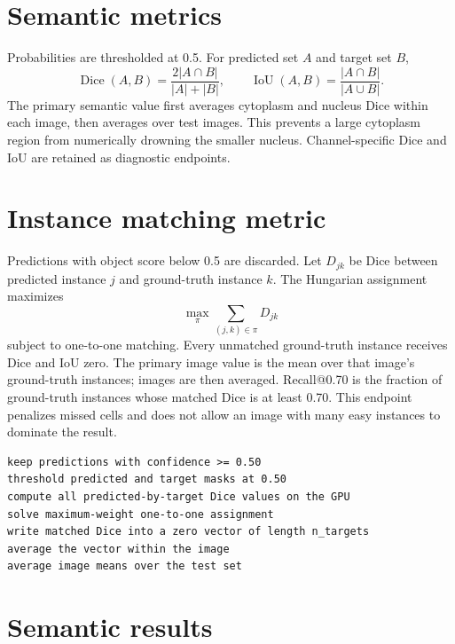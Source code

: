 \section{Semantic metrics}

Probabilities are thresholded at 0.5. For predicted set $A$ and target set $B$,
\begin{equation}
\operatorname{Dice}(A,B)=\frac{2|A\cap B|}{|A|+|B|},\qquad
\operatorname{IoU}(A,B)=\frac{|A\cap B|}{|A\cup B|}.
\end{equation}
The primary semantic value first averages cytoplasm and nucleus Dice within each image, then averages over test images. This prevents a large cytoplasm region from numerically drowning the smaller nucleus. Channel-specific Dice and IoU are retained as diagnostic endpoints.

\section{Instance matching metric}

Predictions with object score below 0.5 are discarded. Let $D_{jk}$ be Dice between predicted instance $j$ and ground-truth instance $k$. The Hungarian assignment~\cite{kuhn1955hungarian} maximizes
\begin{equation}
\max_{\pi}\sum_{(j,k)\in\pi}D_{jk}
\end{equation}
subject to one-to-one matching. Every unmatched ground-truth instance receives Dice and IoU zero. The primary image value is the mean over that image's ground-truth instances; images are then averaged. Recall@0.70 is the fraction of ground-truth instances whose matched Dice is at least 0.70. This endpoint penalizes missed cells and does not allow an image with many easy instances to dominate the result.

\begin{lstlisting}[style=cyto,caption={Exact logic of the matched-instance endpoint.},label={lst:instance-metric}]
keep predictions with confidence >= 0.50
threshold predicted and target masks at 0.50
compute all predicted-by-target Dice values on the GPU
solve maximum-weight one-to-one assignment
write matched Dice into a zero vector of length n_targets
average the vector within the image
average image means over the test set
\end{lstlisting}

\section{Semantic results}

